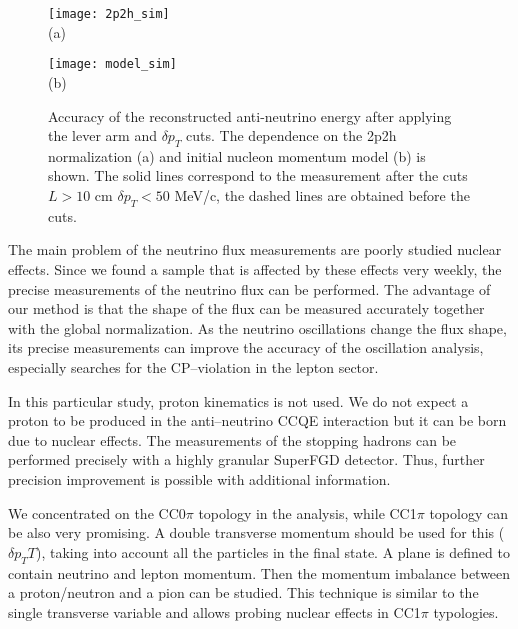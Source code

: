 \documentclass[main.tex]{subfiles}
\begin{document}
\begin{figure}[!ht]
  \centering
  \begin{minipage}{0.49\linewidth}
    \centering
    \texttt{[image: 2p2h\_sim]} \\ (a)
  \end{minipage}
  \begin{minipage}{0.49\linewidth}
    \centering
    \texttt{[image: model\_sim]} \\ (b)
  \end{minipage}
  \caption{Accuracy of the reconstructed anti-neutrino energy after applying the lever arm and $\delta p_T$ cuts. The dependence on the 2p2h normalization (a) and initial nucleon momentum model (b) is shown. The solid lines correspond to the measurement after the cuts $L>10$ cm $\delta p_T < 50$ MeV/c, the dashed lines are obtained before the cuts.}
  \label{fig:up:n:model}
\end{figure}

The main problem of the neutrino flux measurements are poorly studied nuclear effects. Since we found a sample that is affected by these effects very weekly, the precise measurements of the neutrino flux can be performed. The advantage of our method is that the shape of the flux can be measured accurately together with the global normalization. As the neutrino oscillations change the flux shape, its precise measurements can improve the accuracy of the oscillation analysis, especially searches for the CP--violation in the lepton sector.

In this particular study, proton kinematics is not used. We do not expect a proton to be produced in the anti--neutrino CCQE interaction but it can be born due to nuclear effects. The measurements of the stopping hadrons can be performed precisely with a highly granular SuperFGD detector. Thus, further precision improvement is possible with additional information.

We concentrated on the CC0$\pi$ topology in the analysis, while CC1$\pi$ topology can be also very promising. A double transverse momentum should be used for this ($\delta p_TT$), taking into account all the particles in the final state. A plane is defined to contain neutrino and lepton momentum. Then the momentum imbalance between a proton/neutron and a pion can be studied. This technique is similar to the single transverse variable and allows probing nuclear effects in CC1$\pi$ typologies.
\end{document}
